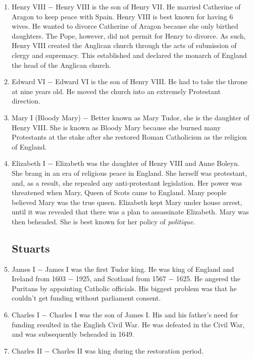 \documentclass[12pt]{article}
\begin{document}
\begin{enumerate}
\item Henry VIII $-$ Henry VIII is the son of Henry VII. He married Catherine of Aragon to keep peace with Spain. Henry VIII is best known for having 6 wives. He wanted to divorce Catherine of Aragon because she only birthed daughters. The Pope, however, did not permit for Henry to divorce. As such, Henry VIII created the Anglican church through the acts of submission of clergy and supremacy. This established and declared the monarch of England the head of the Anglican church.

\item Edward VI $-$ Edward VI is the son of Henry VIII. He had to take the throne at nine years old. He moved the church into an extremely Protestant direction.

\item Mary I (Bloody Mary) $-$ Better known as Mary Tudor, she is the daughter of Henry VIII. She is known as Bloody Mary because she burned many Protestants at the stake after she restored Roman Catholicism as the religion of England.

\item Elizabeth I $-$ Elizabeth was the daughter of Henry VIII and Anne Boleyn. She brang in an era of religious peace in England. She herself was protestant, and, as a result, she repealed any anti-protestant legislation. Her power was threatened when Mary, Queen of Scots came to England. Many people believed Mary was the true queen. Elizabeth kept Mary under house arrest, until it was revealed that there was a plan to assassinate Elizabeth. Mary was then beheaded. She is best known for her policy of \textit{politique}.

\subsection{Stuarts}

\item James I $-$ James I was the first Tudor king. He was king of England and Ireland from 1603 $-$ 1925, and Scotland from 1567 $-$ 1625. He angered the Puritans by appointing Catholic officials. His biggest problem was that he couldn't get funding without parliament consent. 

\item Charles I $-$ Charles I was the son of James I. His and his father's need for funding resulted in the English Civil War. He was defeated in the Civil War, and was subsequently beheaded in 1649.

\item Charles II $-$ Charles II was king during the restoration period.


\end{enumerate}
\end{document}
